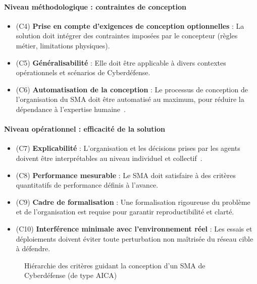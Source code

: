 \paragraph{Niveau méthodologique : contraintes de conception}
\begin{itemize}
    \item (C4) \textbf{Prise en compte d'exigences de conception optionnelles} : La solution doit intégrer des contraintes imposées par le concepteur (règles métier, limitations physiques).
    \item (C5) \textbf{Généralisabilité} : Elle doit être applicable à divers contextes opérationnels et scénarios de Cyberdéfense.
    \item (C6) \textbf{Automatisation de la conception} : Le processus de conception de l'organisation du \ac{SMA} doit être automatisé au maximum, pour réduire la dépendance à l'expertise humaine~\cite{Dennis2010}.
\end{itemize}

\paragraph{Niveau opérationnel : efficacité de la solution}
\begin{itemize}
    \item (C7) \textbf{Explicabilité} : L'organisation et les décisions prises par les agents doivent être interprétables au niveau individuel et collectif~\cite{Boella2006}.
    \item (C8) \textbf{Performance mesurable} : Le \ac{SMA} doit satisfaire à des critères quantitatifs de performance définis à l'avance.
    \item (C9) \textbf{Cadre de formalisation} : Une formalisation rigoureuse du problème et de l'organisation est requise pour garantir reproductibilité et clarté.
    \item (C10) \textbf{Interférence minimale avec l'environnement réel} : Les essais et déploiements doivent éviter toute perturbation non maîtrisée du réseau cible à défendre.
\end{itemize}

\begin{figure}[h]
    \centering
    \resizebox{\textwidth}{!}{%
        
    }
    \caption{Hiérarchie des critères guidant la conception d'un \ac{SMA} de Cyberdéfense (de type \ac{AICA})}
    \label{fig:criteria}
\end{figure}


